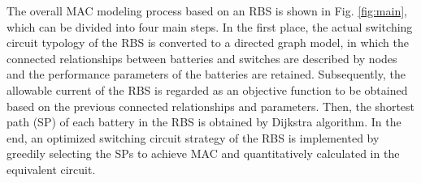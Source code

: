 \documentclass{article}
\begin{document}
The overall MAC modeling process based on an RBS is shown in Fig. \ref{fig:main}, which can be divided into four main steps.
In the first place, the actual switching circuit typology of the RBS is converted to a directed graph model, in which the connected relationships between batteries and switches are described by nodes and the performance parameters of the batteries are retained.
Subsequently, the allowable current of the RBS is regarded as an objective function to be obtained based on the previous connected relationships and parameters.
Then, the shortest path (SP) of each battery in the RBS is obtained by Dijkstra algorithm.
In the end, an optimized switching circuit strategy of the RBS is implemented by greedily selecting the SPs to achieve MAC and quantitatively calculated in the equivalent circuit.


\end{document}
